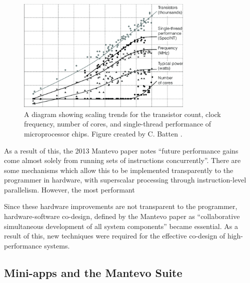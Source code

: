 
\begin{figure}[H]
    \centering
    \includegraphics[width=0.75\textwidth]{images/2_background/Scaling-trends-for-the-transistor-count-clock-frequency-number-of-cores-and.png}
    \caption{A diagram showing scaling trends for the transistor count, clock frequency, number of cores, and single-thread performance of microprocessor chips. Figure created by C. Batten \cite{hardwareTrendsArticle}.}
    \label{fig:scaling-trends-transistor-clock}
\end{figure}

As a result of this, the 2013 Mantevo paper notes ``future performance gains come almost solely from running sets of instructions concurrently''. There are some mechanisms which allow this to be implemented transparently to the programmer in hardware, with superscalar processing through instruction-level parallelism. However, the most performant 

Since these hardware improvements are not transparent to the programmer, hardware-software co-design, defined by the Mantevo paper as ``collaborative simultaneous development of all system components'' became essential. As a result of this, new techniques were required for the effective co-design of high-performance systems.

\subsection{Mini-apps and the Mantevo Suite}
\label{ssec:mantevo} %


